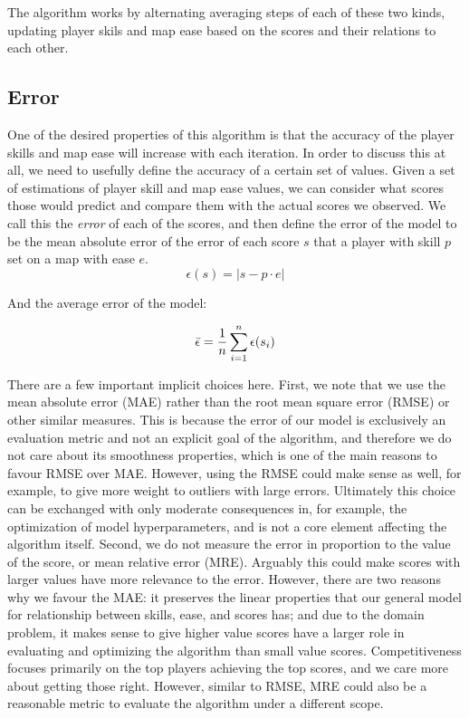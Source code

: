 \documentclass[12pt,a4paper]{article}
\begin{document}
The algorithm works by alternating averaging steps of each of these two kinds, updating player skils and map ease based on the scores and their relations to each other.\\

\subsection{Error}
\label{error_section}

One of the desired properties of this algorithm is that the accuracy of the player skills and map ease will increase with each iteration. In order to discuss this at all, we need to usefully define the accuracy of a certain set of values. Given a set of estimations of player skill and map ease values, we can consider what scores those would predict and compare them with the actual scores we observed. We call this the {\emph{error}} of each of the scores, and then define the error of the model to be the mean absolute error of the error of each score $s$ that a player with skill $p$ set on a map with ease $e$.\\

\begin{equation}
\label{error}
\epsilon(s) = |s -  p \cdot e|
\end{equation}

And the average error of the model:

\begin{equation}
\label{average_error}
\bar{\epsilon} ={{1} \over {n}} \sum\limits_{i=1}^{n} \epsilon(s_i)
\end{equation}

There are a few important implicit choices here. First, we note that we use the mean absolute error (MAE) rather than the root mean square error (RMSE) or other similar measures. This is because the error of our model is exclusively an evaluation metric and not an explicit goal of the algorithm, and therefore we do not care about its smoothness properties, which is one of the main reasons to favour RMSE over MAE. However, using the RMSE could make sense as well, for example, to give more weight to outliers with large errors. Ultimately this choice can be exchanged with only moderate consequences in, for example, the optimization of model hyperparameters, and is not a core element affecting the algorithm itself. Second, we do not measure the error in proportion to the value of the score, or mean relative error (MRE). Arguably this could make scores with larger values have more relevance to the error. However, there are two reasons why we favour the MAE: it preserves the linear properties that our general model for relationship between skills, ease, and scores has; and due to the domain problem, it makes sense to give higher value scores have a larger role in evaluating and optimizing the algorithm than small value scores. Competitiveness focuses primarily on the top players achieving the top scores, and we care more about getting those right. However, similar to RMSE, MRE could also be a reasonable metric to evaluate the algorithm under a different scope.\\
\end{document}
